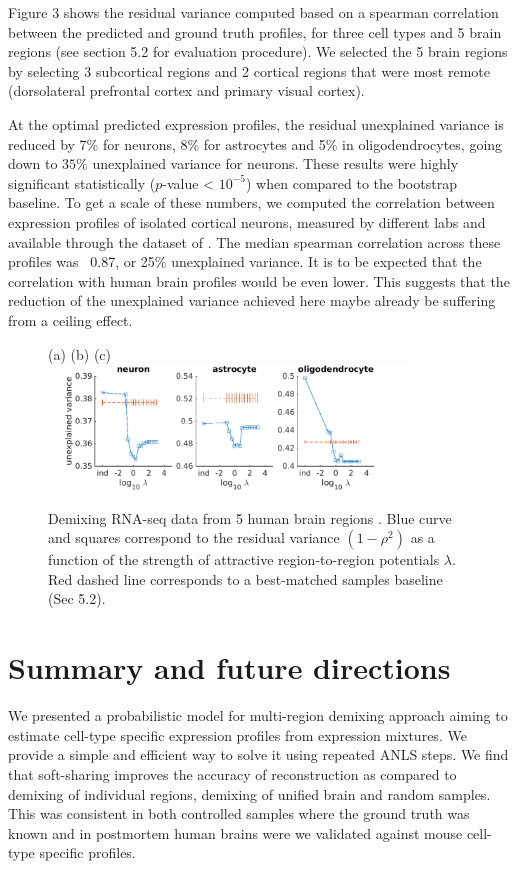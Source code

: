 \documentclass{article} %
\begin{document}
Figure 3 shows the residual variance computed based on a spearman correlation between the predicted and ground truth profiles, for three cell types and 5 brain regions (see section 5.2 for evaluation procedure). We selected the 5 brain regions by selecting 3 subcortical regions and 2 cortical regions that were most remote (dorsolateral prefrontal cortex and primary visual cortex).

At the optimal predicted expression profiles, the residual unexplained variance is reduced by 7\% for neurons, 8\% for astrocytes and 5\% in oligodendrocytes, going down to $35\%$ unexplained variance for neurons. These results were highly significant statistically ($p$-value < $10^{-5}$) when compared to the bootstrap baseline. To get a scale of these numbers, we computed the correlation between expression profiles of isolated cortical neurons, measured by different labs and available through the dataset of \cite{okaty2011cell}. The median spearman correlation across these profiles was ~0.87, or 25\% unexplained variance. It is to be expected that the correlation with human brain profiles would be even lower. This suggests that the reduction of the unexplained variance achieved here maybe already be suffering from a ceiling effect.

\begin{figure}[!hbt]
    \label{fig:human}
   (a) \hspace{120pt}(b) \hspace{120pt}(c) \hspace{120pt}
   \centering
     \includegraphics[width=0.85\textwidth]{3panels_var_AMY-CBC-DFC-HIP-V1C.png}
     \caption{Demixing RNA-seq data from 5 human brain regions \cite{brainspan}. Blue curve and squares correspond to the residual variance $(1-\rho^2)$ as a function of the strength of attractive region-to-region potentials $\lambda$. Red dashed line corresponds to a best-matched samples baseline (Sec 5.2).}
    
\end{figure}


\section{Summary and future directions}
We presented a probabilistic model for multi-region demixing approach aiming to estimate cell-type specific expression profiles from expression mixtures. We provide a simple and efficient way to solve it using repeated ANLS steps. We find that soft-sharing improves the accuracy of reconstruction as compared to demixing of individual regions, demixing of unified brain and random samples. This was consistent in both controlled samples where the ground truth was known and in postmortem human brains were we validated against mouse cell-type specific profiles.
\end{document}
